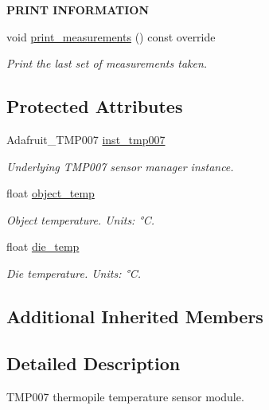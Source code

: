 \begin{Indent}{\bf P\+R\+I\+NT I\+N\+F\+O\+R\+M\+A\+T\+I\+ON}\par
\begin{DoxyCompactItemize}
\item 
void \hyperlink{class_loom___t_m_p007_a51880b75b8e1fc2b069acb1899b43e5a}{print\+\_\+measurements} () const override
\begin{DoxyCompactList}\small\item\em Print the last set of measurements taken. \end{DoxyCompactList}\end{DoxyCompactItemize}
\end{Indent}
\subsection*{Protected Attributes}
\begin{DoxyCompactItemize}
\item 
Adafruit\+\_\+\+T\+M\+P007 \hyperlink{class_loom___t_m_p007_ab32371c9649b51b8592d2a783617cf97}{inst\+\_\+tmp007}
\begin{DoxyCompactList}\small\item\em Underlying T\+M\+P007 sensor manager instance. \end{DoxyCompactList}\item 
float \hyperlink{class_loom___t_m_p007_ae75459c624c69fd36cf699200ead2c8a}{object\+\_\+temp}
\begin{DoxyCompactList}\small\item\em Object temperature. Units\+: °C. \end{DoxyCompactList}\item 
float \hyperlink{class_loom___t_m_p007_a93d28d31fe70ff78782942b7f2a7e840}{die\+\_\+temp}
\begin{DoxyCompactList}\small\item\em Die temperature. Units\+: °C. \end{DoxyCompactList}\end{DoxyCompactItemize}
\subsection*{Additional Inherited Members}


\subsection{Detailed Description}
T\+M\+P007 thermopile temperature sensor module. 


